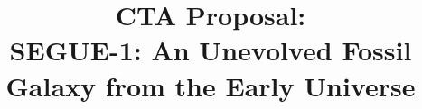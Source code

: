 \documentclass{aastex631}
\begin{document}
\title{CTA Proposal:\\SEGUE-1: An Unevolved Fossil Galaxy from the Early Universe}


\end{document}
